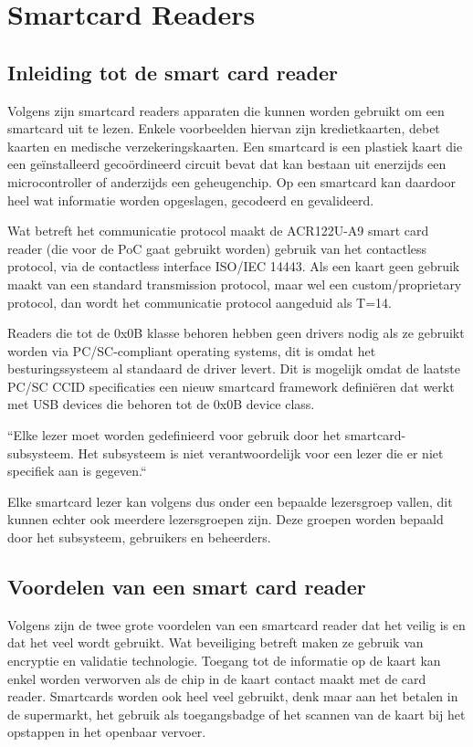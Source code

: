 \section{Smartcard Readers}
\subsection{Inleiding tot de smart card reader}
Volgens \textcite{OnyaitOdekeCardReader} zijn smartcard readers apparaten die kunnen worden gebruikt om een smartcard uit te lezen. Enkele voorbeelden hiervan zijn kredietkaarten, debet kaarten en medische verzekeringskaarten. Een smartcard is een plastiek kaart die een geïnstalleerd gecoördineerd circuit bevat dat kan bestaan uit enerzijds een microcontroller of anderzijds een geheugenchip. Op een smartcard kan daardoor heel wat informatie worden opgeslagen, gecodeerd en gevalideerd.

Wat betreft het communicatie protocol maakt de ACR122U-A9 smart card reader (die voor de PoC gaat gebruikt worden) gebruik van het contactless protocol, via de contactless interface ISO/IEC 14443. Als een kaart geen gebruik maakt van een standard transmission protocol, maar wel een custom/proprietary protocol, dan wordt het communicatie protocol aangeduid als T=14.

Readers die tot de 0x0B klasse behoren hebben geen drivers nodig als ze gebruikt worden via PC/SC-compliant operating systems, dit is omdat het besturingssysteem al standaard de driver levert. Dit is mogelijk omdat de laatste PC/SC CCID specificaties een nieuw smartcard framework definiëren dat werkt met USB devices die behoren tot de 0x0B device class.


``Elke lezer moet worden gedefinieerd voor gebruik door het smartcard-subsysteem. Het subsysteem is niet verantwoordelijk voor een lezer die er niet specifiek aan is gegeven.``\autocite{MicrosoftSmartCardReaders}

Elke smartcard lezer kan volgens \textcite{MicrosoftSmartCardReaders} dus onder een bepaalde lezersgroep vallen, dit kunnen echter ook meerdere lezersgroepen zijn. Deze groepen worden bepaald door het subsysteem, gebruikers en beheerders.

\subsection{Voordelen van een smart card reader}
Volgens \textcite{OnyaitOdekeCardReader} zijn de twee grote voordelen van een smartcard reader dat het veilig is en dat het veel wordt gebruikt. Wat beveiliging betreft maken ze gebruik van encryptie en validatie technologie. Toegang tot de informatie op de kaart kan enkel worden verworven als de chip in de kaart contact maakt met de card reader. Smartcards worden ook heel veel gebruikt, denk maar aan het betalen in de supermarkt, het gebruik als toegangsbadge of het scannen van de kaart bij het opstappen in het openbaar vervoer.


